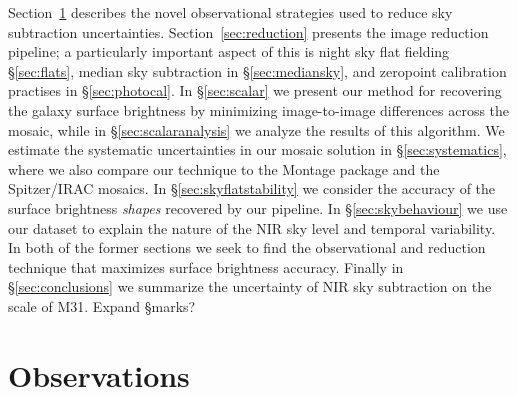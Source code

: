\documentclass[iop]{emulateapj}
\newcommand{\todo}[1]{\textcolor{BurntOrange}{\textsf{#1}}} %
\newcommand{\Sec}[1]{\S\ref{sec:#1}}  %
\begin{document}
Section~\ref{sec:Observations} describes the novel observational strategies used to reduce sky subtraction uncertainties.
Section~\ref{sec:reduction} presents the image reduction pipeline; a particularly important aspect of this is night sky flat fielding \Sec{flats}, median sky subtraction in \Sec{mediansky}, and zeropoint calibration practises in \Sec{photocal}.
In \Sec{scalar} we present our method for recovering the galaxy surface brightness by minimizing image-to-image differences across the mosaic, while in \Sec{scalaranalysis} we analyze the results of this algorithm.
We estimate the systematic uncertainties in our mosaic solution in \Sec{systematics}, where we also compare our technique to the Montage package \citep{Berriman:2008} and the Spitzer/IRAC mosaics.
In \Sec{skyflatstability} we consider the accuracy of the surface brightness \emph{shapes} recovered by our pipeline.
In \Sec{skybehaviour} we use our dataset to explain the nature of the NIR sky level and temporal variability.
In both of the former sections we seek to find the observational and reduction technique that maximizes surface brightness accuracy.
Finally in \S\ref{sec:conclusions} we summarize the uncertainty of NIR sky subtraction on the scale of M31.
\todo{Expand \S marks?}

\section{Observations}
\label{sec:Observations}
\end{document}
